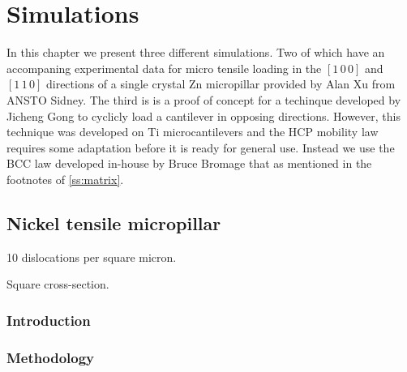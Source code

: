 \chapter{Simulations}\label{c:simulations}

In this chapter we present three different simulations. Two of which have an accompaning experimental data for micro tensile loading in the $[1\, 0\, 0]$ and $[1\, 1\, 0]$ directions of a single crystal Zn micropillar provided by Alan Xu from ANSTO Sidney. The third is is a proof of concept for a techinque developed by Jicheng Gong to cyclicly load a cantilever in opposing directions. However, this technique was developed on Ti microcantilevers and the HCP mobility law requires some adaptation before it is ready for general use. Instead we use the BCC law developed in-house by Bruce Bromage that as mentioned in the footnotes of \cref{ss:matrix}.

\section{Nickel tensile micropillar}\label{s:nickelTensile}

10 dislocations per square micron.

Square cross-section.
\subsection{Introduction}
\subsection{Methodology}

